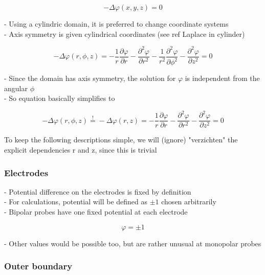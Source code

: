 \documentclass[parskip=half, titlepage=yes, 12pt, BCOR=12mm, DIV=calc]{scrartcl}
\begin{document}
\begin{equation}
    - \Delta \varphi(x,y,z) = 0
\end{equation}

- Using a cylindric domain, it is preferred to change coordinate systems \\
- Axis symmetry is given cylindrical coordinates (see ref Laplace in cylinder)

\begin{equation}
    - \Delta \varphi(r,\phi,z) = - \frac{1}{r} \frac{\partial \varphi}{\partial r} - \frac{\partial^2 \varphi}{\partial r^2} - \frac{1}{r^2} \frac{\partial^2 \varphi}{\partial \phi^2} -      \frac{\partial^2 \varphi}{\partial z^2}  = 0
\end{equation}

- Since the domain has axis symmetry, the solution for $\varphi$ is independent from the angular $\phi$ \\
- So equation basically simplifies to 

\begin{equation}
    - \Delta \varphi(r,\phi,z) \overset{!}{=} - \Delta \varphi(r,z) = - \frac{1}{r} \frac{\partial \varphi}{\partial r} - \frac{\partial^2 \varphi}{\partial r^2} - \frac{\partial^2 \varphi}{\partial z^2} = 0
\end{equation}

To keep the following descriptions simple, we will (ignore) "verzichten" the explicit dependencies r and z, since this is trivial

\subsubsection{Electrodes}

- Potential difference on the electrodes is fixed by definition \\
- For calculations, potential will be defined as $\pm 1$ chosen arbitrarily \\
- Bipolar probes have one fixed potential at each electrode

\begin{equation}
    \varphi = \pm 1
\end{equation}

- Other values would be possible too, but are rather unusual at monopolar probes \\

\subsubsection{Outer boundary}
\end{document}
